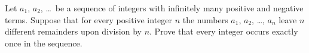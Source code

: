 Let $a_1$, $a_2$, \dots\ be a sequence of integers
with infinitely many positive and negative terms.
Suppose that for every positive integer $n$
the numbers $a_1$, $a_2$, \dots, $a_n$
leave $n$ different remainders upon division by $n$.
Prove that every integer occurs exactly once in the sequence.